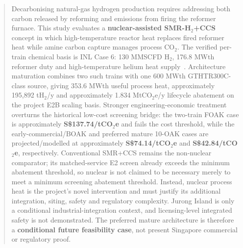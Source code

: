 \begin{abstract}
Decarbonising natural-gas hydrogen production requires addressing both carbon released by reforming and emissions from firing the reformer furnace. This study evaluates a \textbf{nuclear-assisted SMR-H$_2$+CCS} concept in which high-temperature reactor heat replaces fired reformer heat while amine carbon capture manages process CO$_2$. The verified per-train chemical basis is INL Case 6: 130 MMSCFD H$_2$, 176.8 MWth reformer duty and high-temperature helium heat supply~\cite{inltev953,inltev961}. Architecture maturation combines two such trains with one 600 MWth GTHTR300C-class source, giving 353.6 MWth useful process heat, approximately 195,892 tH$_2$/y and approximately 1.834 MtCO$_2$e/y lifecycle abatement on the project E2B scaling basis. Stronger engineering-economic treatment overturns the historical low-cost screening bridge: the two-train FOAK case is approximately \textbf{S\$137.74/tCO$_2$e} and fails the cost threshold, while the early-commercial/BOAK and preferred mature 10-OAK cases are projected/modelled at approximately \textbf{S\$74.14/tCO$_2$e} and \textbf{S\$42.84/tCO$_2$e}, respectively. Conventional SMR+CCS remains the non-nuclear comparator; its matched-service E2 screen already exceeds the minimum abatement threshold, so nuclear is not claimed to be necessary merely to meet a minimum screening abatement threshold. Instead, nuclear process heat is the project's novel intervention and must justify its additional integration, siting, safety and regulatory complexity. Jurong Island is only a conditional industrial-integration context, and licensing-level integrated safety is not demonstrated. The preferred mature architecture is therefore a \textbf{conditional future feasibility case}, not present Singapore commercial or regulatory proof.
\end{abstract}
